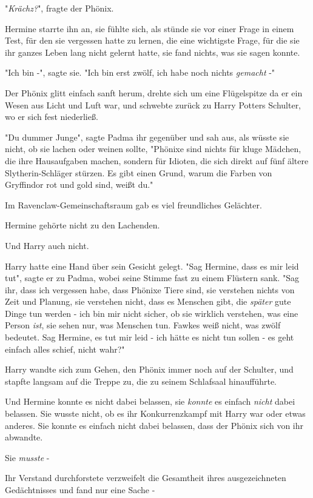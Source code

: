 {"\emph{Krächz?}", fragte der Phönix.

Hermine starrte ihn an, sie fühlte sich, als stünde sie vor einer Frage in einem Test, für den sie vergessen hatte zu lernen, die eine wichtigste Frage, für die sie ihr ganzes Leben lang nicht gelernt hatte, sie fand nichts, was sie sagen konnte.

"Ich bin -", sagte sie. "Ich bin erst zwölf, ich habe noch nichts \emph{gemacht} -"

Der Phönix glitt einfach sanft herum, drehte sich um eine Flügelspitze da er ein Wesen aus Licht und Luft war, und schwebte zurück zu Harry Potters Schulter, wo er sich fest niederließ.

"Du dummer Junge", sagte Padma ihr gegenüber und sah aus, als wüsste sie nicht, ob sie lachen oder weinen sollte, "Phönixe sind nichts für kluge Mädchen, die ihre Hausaufgaben machen, sondern für Idioten, die sich direkt auf fünf ältere Slytherin-Schläger stürzen. Es gibt einen Grund, warum die Farben von Gryffindor rot und gold sind, weißt du."

Im Ravenclaw-Gemeinschaftsraum gab es viel freundliches Gelächter.

Hermine gehörte nicht zu den Lachenden.

Und Harry auch nicht.

Harry hatte eine Hand über sein Gesicht gelegt. "Sag Hermine, dass es mir leid tut", sagte er zu Padma, wobei seine Stimme fast zu einem Flüstern sank. "Sag ihr, dass ich vergessen habe, dass Phönixe Tiere sind, sie verstehen nichts von Zeit und Planung, sie verstehen nicht, dass es Menschen gibt, die \emph{später} gute Dinge tun werden - ich bin mir nicht sicher, ob sie wirklich verstehen, was eine Person \emph{ist}, sie sehen nur, was Menschen tun. Fawkes weiß nicht, was zwölf bedeutet. Sag Hermine, es tut mir leid - ich hätte es nicht tun sollen - es geht einfach alles schief, nicht wahr?"

Harry wandte sich zum Gehen, den Phönix immer noch auf der Schulter, und stapfte langsam auf die Treppe zu, die zu seinem Schlafsaal hinaufführte.

Und Hermine konnte es nicht dabei belassen, sie \emph{konnte} es einfach \emph{nicht} dabei belassen. Sie wusste nicht, ob es ihr Konkurrenzkampf mit Harry war oder etwas anderes. Sie konnte es einfach nicht dabei belassen, dass der Phönix sich von ihr abwandte.

Sie \emph{musste} -

Ihr Verstand durchforstete verzweifelt die Gesamtheit ihres ausgezeichneten Gedächtnisses und fand nur eine Sache -

}
